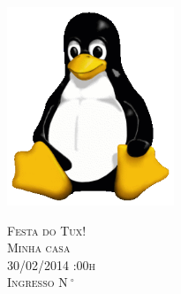 \documentclass{article}
\newcounter{ingresso}
\begin{document}
\pagestyle{empty}

{
   \vspace{0.7cm}
   \begin{minipage}{10cm}
      \begin{center}
         \includegraphics[width=5cm]{../img/Tux.png}
      \end{center}
   \end{minipage}
   \begin{minipage}{12cm}
      \vspace{.45cm}
      \begin{center}
         \LARGE{\textsc{Festa do Tux!}}\\
         \LARGE{\textsc{Minha casa}}\\
         \LARGE{\textsc{30/02/2014 :00h}}\\
         \textsc{Ingresso N$\ \mbox{}^{\circ}$ }
      \end{center}
      \vspace{.1cm}
   \end{minipage}
}
\end{document}
